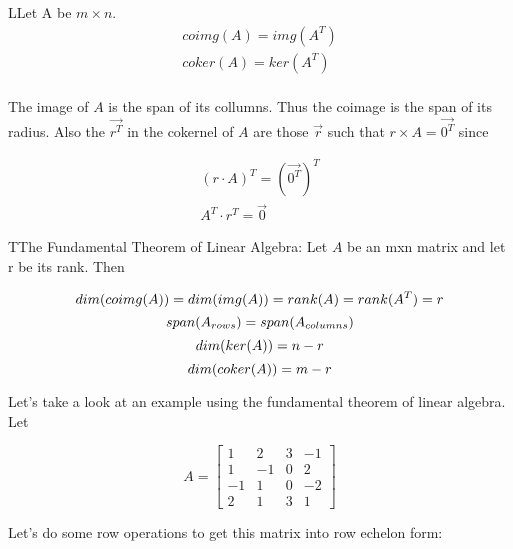   \begin{definition}
    LLet A be $m\times n$. 
    \begin{align}
      coimg(A)=img(A^T)\\
      coker(A)=ker(A^T)\\
    \end{align}
  \end{definition}

  The image of $A$ is the span of its collumns. Thus the coimage is the span of its radius. Also the $\vec{r^T}$ in the cokernel of $A$ are those $\vec{r}$ such that $r\times A=\vec{0^T}$ since

  \begin{align}
    (r\cdot A)^T=(\vec{0^T})^T\\
    A^T\cdot r^T=\vec{0}
  \end{align}

  \begin{theorem}
    TThe Fundamental Theorem of Linear Algebra: Let $A$ be an mxn matrix and let r be its rank. Then

    \begin{equation}
      dim(coimg(A))=dim(img(A))=rank(A)=rank(A^T)=r\\
    \end{equation}
    \begin{equation}
      span(A_{rows})=span(A_{columns})\\
    \end{equation}
    \begin{equation}
      dim(ker(A))=n-r\\
    \end{equation}
    \begin{equation}
      dim(coker(A))=m-r\\
    \end{equation}
  \end{theorem}

  Let's take a look at an example using the fundamental theorem of linear algebra. Let

  \begin{equation}
    A=\begin{bmatrix}
      1&2&3&-1\\
      1&-1&0&2\\
      -1&1&0&-2\\
      2&1&3&1
    \end{bmatrix}
  \end{equation}

  Let's do some row operations to get this matrix into row echelon form:

